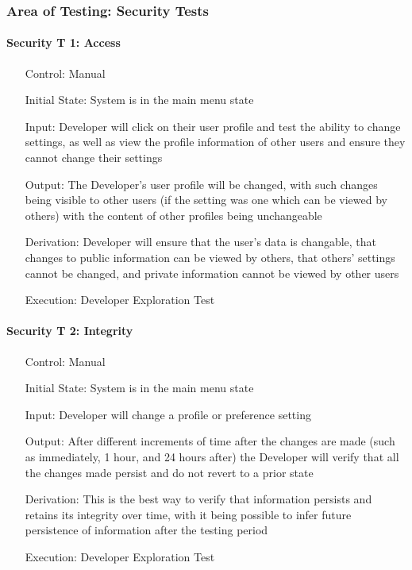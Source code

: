 \documentclass[12pt, titlepage]{article}
\begin{document}
\subsubsection{Area of Testing: Security Tests}

\paragraph*{Security T 1: Access}
\begin{itemize}
	\item[Control:] Manual
	\item[Initial State:] System is in the main menu state
	\item[Input:] Developer will click on their user profile and test the ability to change settings, as well as view the profile information of other users and ensure they cannot change their settings
	\item[Output:] The Developer's user profile will be changed, with such changes being visible to other users (if the setting was one which can be viewed by others) with the content of other profiles being unchangeable
	\item[Derivation:] Developer will ensure that the user's data is changable, that changes to public information can be viewed by others, that others' settings cannot be changed, and private information cannot be viewed by other users
	\item[Execution:] Developer Exploration Test
\end{itemize}

\paragraph*{Security T 2: Integrity}

\begin{itemize}
	\item[Control:] Manual
	\item[Initial State:] System is in the main menu state
	\item[Input:] Developer will change a profile or preference setting
	\item[Output:] After different increments of time after the changes are made (such as immediately, 1 hour, and 24 hours after) the Developer will verify that all the changes made persist and do not revert to a prior state
	\item[Derivation:] This is the best way to verify that information persists and retains its integrity over time, with it being possible to infer future persistence of information after the testing period
	\item[Execution:] Developer Exploration Test
\end{itemize}
\end{document}
